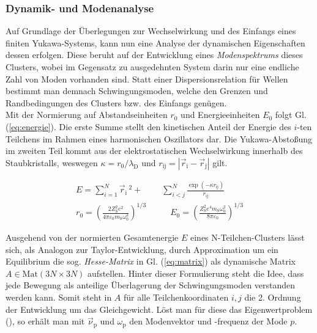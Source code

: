 \documentclass[numbers=noenddot,a4paper]{scrartcl}
\newcommand{\ix}[1]{_\text{#1}}
\newcommand{\tilt}[1]{\textit{#1}}
\begin{document}
				\subsubsection{Dynamik- und Modenanalyse} \label{subsub:moden}

					Auf Grundlage der Überlegungen zur Wechselwirkung und des Einfangs eines finiten Yukawa-Systems, kann nun eine Analyse der dynamischen Eigenschaften dessen erfolgen. Diese beruht auf der Entwicklung eines \tilt{Modenspektrums} dieses Clusters, wobei im Gegensatz zu ausgedehnten System darin nur eine endliche Zahl von Moden vorhanden sind. Statt einer Dispersionsrelation für Wellen bestimmt man demnach Schwingungsmoden, welche den Grenzen und Randbedingungen des Clusters bzw. des Einfangs genügen.\\
					Mit der Normierung auf Abstandseinheiten $r\ix{0}$ und Energieeinheiten $E\ix{0}$ folgt Gl. (\ref{eq:energie}). Die erste Summe stellt den kinetischen Anteil der Energie des $i$-ten Teilchens im Rahmen eines harmonischen Oszillators dar. Die Yukawa-Abstoßung im zweiten Teil kommt aus der elektrostatischen Wechselwirkung innerhalb des Staubkristalls, weswegen $\kappa=r\ix{0}/\lambda\ix{D}$ und $r\ix{ij}=|\vec{r}\ix{i}-\vec{r}\ix{j}|$ gilt.

						\begin{align}
							E=\sum_{i=1}^{N}\vec{r}\ix{i}\,^2+&\sum_{i<j}^{N}\frac{\exp\left(-\kappa r\ix{ij}\right)}{r\ix{ij}} \label{eq:energie} \\
							r\ix{0}=\left(\frac{2Z\ix{S}^2e^2}{4\pi\varepsilon\ix{0}m\ix{S}\omega\ix{0}^2}\right)^{1/3} \quad &\quad E\ix{0}=\left(\frac{Z\ix{S}^2e^4m\ix{S}\omega\ix{0}^2}{8\pi\varepsilon\ix{0}}\right)^{1/3} \nonumber
						\end{align}

					Ausgehend von der normierten Gesamtenergie $E$ eines N-Teilchen-Clusters lässt sich, als Analogon zur Taylor-Entwicklung, durch Approximation um ein Equilibrium die sog. \tilt{Hesse-Matrix} in Gl. (\ref{eq:matrix}) als dynamische Matrix $A\in\text{Mat}\left(3N\times3N\right)$ aufstellen. Hinter dieser Formulierung steht die Idee, dass jede Bewegung als anteilige Überlagerung der Schwingungsmoden verstanden werden kann. Somit steht in $A$ für alle Teilchenkoordinaten $i,j$ die 2. Ordnung der Entwicklung um das Gleichgewicht. Löst man für diese das Eigenwertproblem (\cite{Schweigert95c}), so erhält man mit $\vec{\nu}\ix{p}$ und $\omega\ix{p}$ den Modenvektor und -frequenz der Mode $p$.
\end{document}

